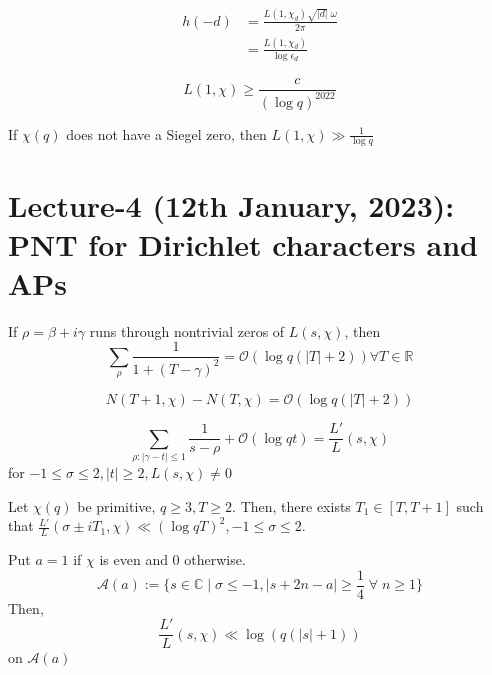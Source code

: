 \documentclass[oneside, 12pt, ]{scrbook}
\newcommand{\CC}{\mathbb C}
\newcommand{\RR}{\mathbb R}
\theoremstyle{theorem}
\begin{document}
\begin{corollary}
\begin{align*}
h(-d) &= \frac{L(1,\chi_{d}) \sqrt{|d|} \;\omega}{2 \pi} \\
&= \frac{L(1,\chi_{d})}{\log \epsilon_{d}}
\end{align*}
\end{corollary}

\begin{theorem}[Y. Zhang]
$$L(1, \chi) \geq \frac{c}{(\log q)^{2022}}$$
\end{theorem}

\begin{theorem}
If $\chi(q)$ does not have a Siegel zero, then $L(1, \chi) \gg \frac{1}{\log q}$
\end{theorem}


\chapter{Lecture-4 (12th January, 2023): PNT for Dirichlet characters and APs}

\begin{lemma}
If $\rho = \beta + i \gamma$ runs through nontrivial zeros of $L(s, \chi)$, then $$\sum_{\rho} \frac{1}{1 + (T - \gamma)^2} = \mathcal{O} (\log q(|T| + 2)) \forall T \in \RR $$
\end{lemma}

\begin{lemma}
$$N(T+1, \chi) - N(T , \chi) = \mathcal{O} (\log q (|T| + 2))$$
\end{lemma}

\begin{lemma}
$$\sum_{\rho: |\gamma - t|\le 1} \frac{1}{s - \rho} + \mathcal{O}(\log qt) = \frac{L'}{L}(s,\chi)$$ for $-1 \le \sigma \le 2 , |t|\geq 2, L(s,\chi) \neq 0$
\end{lemma}

\begin{lemma}
Let $\chi(q)$ be primitive, $q \geq 3, T \geq 2$. Then, there exists $T_{1} \in [T,T+1]$ such that $\frac{L'}{L}(\sigma \pm iT_{1}, \chi) \ll (\log qT)^2 , -1 \le \sigma \le 2$.
\end{lemma}

\begin{lemma}
Put $a=1$ if $\chi$ is even and $0$ otherwise. $$\mathcal{A}(a) := \{ s \in \CC \mid \sigma \le -1 , |s + 2n - a| \geq \frac{1}{4} \; \forall \; n \geq 1\}$$ Then, $$\frac{L'}{L} (s, \chi) \ll \log (q(|s|+1))$$ on $\mathcal{A}(a)$
\end{lemma}
\end{document}
